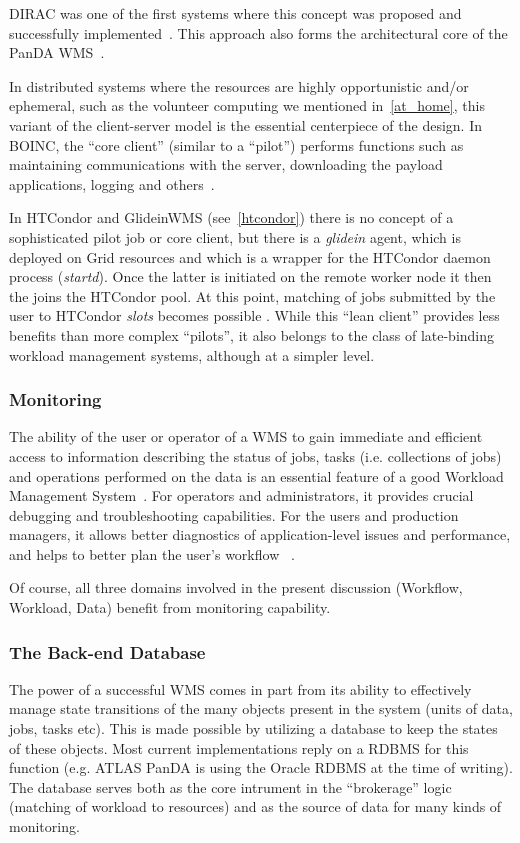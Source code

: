 DIRAC was one of the first systems where this concept was proposed and successfully implemented~\cite{dirac_acat09}. This approach also forms the architectural core
of the PanDA WMS~\cite{panda_chep12}.

In distributed systems where the resources are highly opportunistic and/or ephemeral, such as the volunteer computing we mentioned in~\ref{at_home}, this variant
of the client-server model is the essential centerpiece of the design. In BOINC, the ``core client'' (similar to a ``pilot'') performs functions such as maintaining
communications with the server, downloading the payload applications, logging and others~\cite{boinc_client}.

In HTCondor and GlideinWMS (see~\ref{htcondor}) there is no concept of a sophisticated pilot job or core client, but there is a \textit{glidein} agent, which is deployed on Grid resources
and which is a wrapper for the HTCondor daemon process (\textit{startd}). Once the latter is initiated
on the remote worker node it then the joins the HTCondor pool. At this point, matching of jobs submitted by the user to HTCondor \textit{slots} becomes possible \cite{glideinwms}.
While this ``lean client'' provides less benefits than more complex ``pilots'', it also belongs to the class of late-binding workload management systems, although at a simpler level.


\subsubsection{Monitoring}
The ability of the user or operator of a WMS to gain immediate and efficient access to information describing the status of jobs, tasks (i.e. collections of jobs) and operations performed on the data
is an essential feature of a good Workload Management System~\cite{pandamon_chep10}. For operators and administrators, it provides crucial debugging and troubleshooting
capabilities. For the users and production managers, it allows better diagnostics of application-level issues and performance, and helps to better plan the user's workflow
~\cite{pandamon_isgc14}.

Of course, all three domains involved in the present discussion (Workflow, Workload, Data) benefit from monitoring capability.

\subsubsection{The Back-end Database}
The power of a successful WMS comes in part from its ability to effectively manage state transitions of the many objects present
in the system (units of data, jobs, tasks etc). This is made possible by utilizing a database to keep the states of these objects.
Most current implementations reply on a RDBMS for this function (e.g. ATLAS PanDA is using the Oracle RDBMS at the time of writing).
The database serves both as the core intrument in the ``brokerage'' logic (matching of workload to resources) and as the source
of data for many kinds of monitoring.

